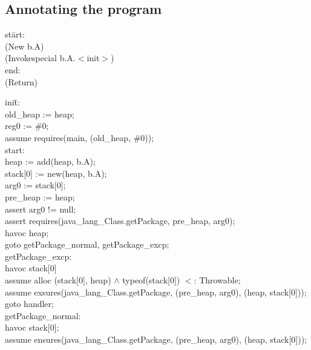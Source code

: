 \subsection{Annotating the program}




\bcode
st\=art:\+\\
    (New b.A) \\
    (Invokespecial b.A.$<$init$>$)\\
\< end:\\
    (Return)
\ecode


\bcode
ini\=t:\+\\
    old\_heap := heap;\\
    reg0 := \#0;\\
    assume requires(main, (old\_heap, \#0));\\
\<start:\\
    heap := add(heap, b.A);\\
    stack[0] := new(heap, b.A);\\
    arg0 := stack[0];\\
    pre\_heap := heap;\\
    assert arg0 != null;\\
    assert requires(java\_lang\_Class.getPackage, pre\_heap, arg0);\\
    havoc heap;\\
    goto getPackage\_normal, getPackage\_excp;\\
\< getPackage\_excp:\\
    havoc stack[0]\\
    assume alloc (stack[0], heap) $\wedge$ typeof(stack[0]) $<$: Throwable;\\
    assume exsures(java\_lang\_Class.getPackage, (pre\_heap, arg0), (heap, stack[0]));\\
    goto handler;\\
\< getPackage\_normal:\\
    havoc stack[0];\\
    assume ensures(java\_lang\_Class.getPackage, (pre\_heap, arg0), (heap, stack[0]));\\

\ecode